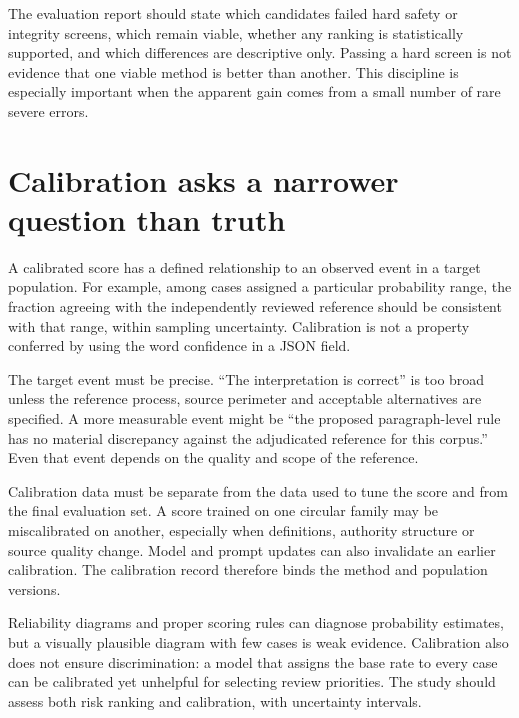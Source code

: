 The evaluation report should state which candidates failed hard safety or
integrity screens, which remain viable, whether any ranking is statistically
supported, and which differences are descriptive only. Passing a hard screen is
not evidence that one viable method is better than another. This discipline is
especially important when the apparent gain comes from a small number of rare
severe errors.

\section{Calibration asks a narrower question than truth}
\label{merge:M09:08}


A calibrated score has a defined relationship to an observed event in a target
population. For example, among cases assigned a particular probability range,
the fraction agreeing with the independently reviewed reference should be
consistent with that range, within sampling uncertainty. Calibration is not a
property conferred by using the word confidence in a JSON field.

The target event must be precise. ``The interpretation is correct'' is too broad
unless the reference process, source perimeter and acceptable alternatives are
specified. A more measurable event might be ``the proposed paragraph-level rule
has no material discrepancy against the adjudicated reference for this corpus.''
Even that event depends on the quality and scope of the reference.

Calibration data must be separate from the data used to tune the score and from
the final evaluation set. A score trained on one circular family may be
miscalibrated on another, especially when definitions, authority structure or
source quality change. Model and prompt updates can also invalidate an earlier
calibration. The calibration record therefore binds the method and population
versions.


Reliability diagrams and proper scoring rules can diagnose probability estimates,
but a visually plausible diagram with few cases is weak evidence. Calibration
also does not ensure discrimination: a model that assigns the base rate to every
case can be calibrated yet unhelpful for selecting review priorities. The study
should assess both risk ranking and calibration, with uncertainty intervals.

